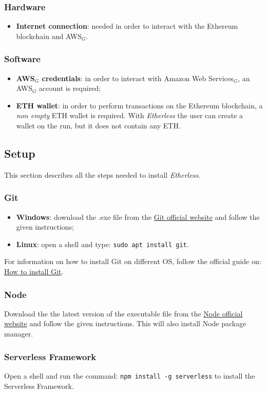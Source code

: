 \subsubsection{Hardware}
\begin{itemize}
	\item \textbf{Internet connection}: needed in order to interact with the Ethereum blockchain and AWS$_{G}$.
\end{itemize}
\subsubsection{Software}
\begin{itemize}
	\item \textbf{AWS$_{G}$ credentials}: in order to interact with Amazon Web Services$_{G}$, an AWS$_{G}$ account is required;
	\item \textbf{ETH wallet}: in order to perform transactions on the Ethereum blockchain, a \textit{non empty} ETH wallet is required. With \textit{Etherless} the user can create a wallet on the run, but it does not contain any ETH.
\end{itemize}
\subsection{Setup}
This section describes all the steps needed to install \textit{Etherless}.
\subsubsection{Git}
\begin{itemize}
	\item \textbf{Windows}: download the .exe file from the \href{https://git-scm.com/download/win}{Git official website} and follow the given instructions;
	\item \textbf{Linux}: open a shell and type: \texttt{sudo apt install git}.
\end{itemize}
	For information on how to install Git on different OS, follow the official guide on: \href{https://git-scm.com/book/en/v2/Getting-Started-Installing-Git}{How to install Git}.
\subsubsection{Node}
	Download the the latest version of the executable file from the \href{https://nodejs.org/it/download/}{Node official website} and follow the given instructions. This will also install Node package manager.
\subsubsection{Serverless Framework}
	Open a shell and run the command: \texttt{npm install -g serverless} to install the Serverless Framework.
